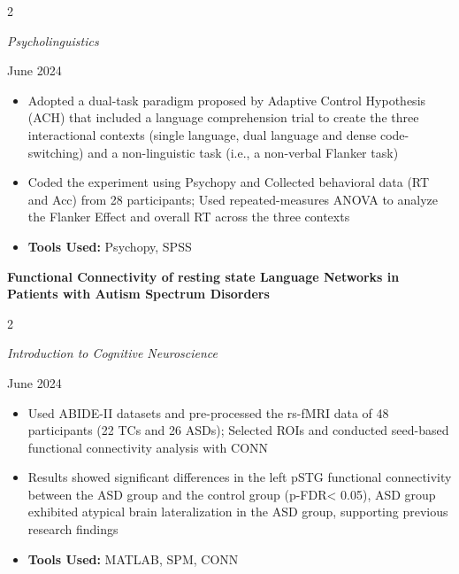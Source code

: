 \documentclass[10pt, letterpaper]{article}
\newenvironment{highlights}{
    \begin{itemize}[
        topsep=0.10 cm,
        parsep=0.10 cm,
        partopsep=0pt,
        itemsep=0pt,
        leftmargin=0 cm + 10pt
    ]
}{
    \end{itemize}
} %
\newenvironment{twocolentry}[2][]{
    \onecolentry
    \def\secondColumn{#2}
    \setcolumnwidth{\fill, 4.5 cm}
    \begin{paracol}{2}
}{
    \switchcolumn \raggedleft \secondColumn
    \end{paracol}
    \endonecolentry
} %
\begin{document}
        \begin{twocolentry}{
            June 2024
        }
            \textit{Psycholinguistics}
        \end{twocolentry}

         \vspace{0.10 cm}

         \begin{highlights}
            \item Adopted a dual-task paradigm proposed by Adaptive Control Hypothesis (ACH) that included a language comprehension trial to create the three interactional contexts (single language, dual language and dense code-switching) and a non-linguistic task (i.e., a non-verbal Flanker task)   
            \item Coded the experiment using Psychopy and Collected behavioral data (RT and Acc) from 28 participants; Used repeated-measures ANOVA to analyze the Flanker Effect and overall RT across the three contexts   
            \item \textbf{Tools Used:} Psychopy, SPSS
         \end{highlights}

    \begin{samepage}
        \textbf{Functional Connectivity of resting state Language Networks in Patients with Autism Spectrum Disorders}

        \vspace{0.10cm}

        \begin{twocolentry}{
            June 2024
        }
            \textit{Introduction to Cognitive Neuroscience}
        \end{twocolentry}

        \vspace{0.10 cm}

        \begin{highlights}
            \item Used ABIDE-II datasets and pre-processed the rs-fMRI data of 48 participants (22 TCs and 26 ASDs); Selected ROIs and conducted seed-based functional connectivity analysis with CONN  
            \item Results showed significant differences in the left pSTG functional connectivity between the ASD group and the control group (p-FDR< 0.05), ASD group exhibited atypical brain lateralization in the ASD group, supporting previous research findings  
            \item \textbf{Tools Used:} MATLAB, SPM, CONN
        \end{highlights}
    \end{samepage}
\end{document}
